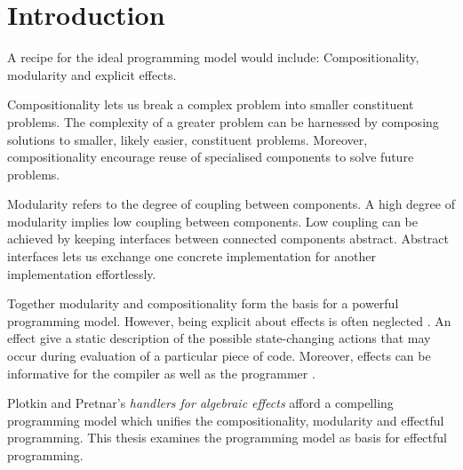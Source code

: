\chapter{Introduction}
A recipe for the ideal programming model would include: Compositionality, modularity and explicit effects.

Compositionality lets us break a complex problem into smaller constituent problems. The complexity of a greater problem can be harnessed by composing solutions to smaller, likely easier, constituent problems. Moreover, compositionality encourage reuse of specialised components to solve future problems.

Modularity refers to the degree of coupling between components. A high degree of modularity implies low coupling between components. Low coupling can be achieved by keeping interfaces between connected components abstract. Abstract interfaces lets us exchange one concrete implementation for another implementation effortlessly.

Together modularity and compositionality form the basis for a powerful programming model. However, being explicit about effects is often neglected \cite{Meijer2014}. An effect give a static description of the possible state-changing actions that may occur during evaluation of a particular piece of code. Moreover, effects can be informative for the compiler as well as the programmer \cite{Kammar2012,Brady2013,Meijer2014}.

Plotkin and Pretnar's \emph{handlers for algebraic effects} \cite{Plotkin2013} afford a compelling programming model which unifies the compositionality, modularity and effectful programming. This thesis examines the programming model as basis for effectful programming.